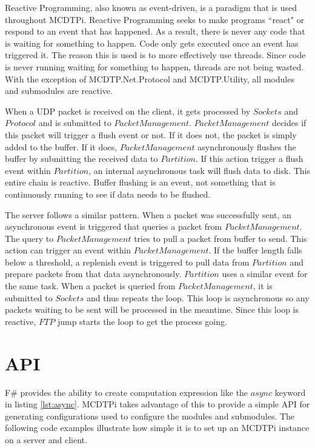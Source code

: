 Reactive Programming, also known as event-driven, is a paradigm that is used throughout MCDTPi. Reactive Programming seeks to make programs ``react" or respond to an event that has happened. As a result, there is never any code that is waiting for something to happen. Code only gets executed once an event has triggered it. The reason this is used is to more effectively use threads. Since code is never running waiting for something to happen, threads are not being wasted. With the exception of MCDTP.Net.Protocol and MCDTP.Utility, all modules and submodules are reactive.

When a UDP packet is received on the client, it gets processed by $Sockets$ and $Protocol$ and is submitted to $PacketManagement$. $PacketManagement$ decides if this packet will trigger a flush event or not. If it does not, the packet is simply added to the buffer. If it does, $PacketManagement$ asynchronously flushes the buffer by submitting the received data to $Partition$. If this action trigger a flush event within $Partition$, an internal asynchronous task will flush data to disk. This entire chain is reactive. Buffer flushing is an event, not something that is continuously running to see if data needs to be flushed.

The server follows a similar pattern. When a packet was successfully sent, an asynchronous event is triggered that queries a packet from $PacketManagement$. The query to $PacketManagement$ tries to pull a packet from buffer to send. This action can trigger an event within $PacketManagement$. If the buffer length falls below a threshold, a replenish event is triggered to pull data from $Partition$ and prepare packets from that data asynchronously. $Partition$ uses a similar event for the same task. When a packet is queried from $PacketManagement$, it is submitted to $Sockets$ and thus repeats the loop. This loop is asynchronous so any packets waiting to be sent will be processed in the meantime. Since this loop is reactive, $FTP$ jump starts the loop to get the process going.

\section{API}\label{sec:api}

F\# provides the ability to create computation expression like the $async$ keyword in listing \ref{lst:async}. MCDTPi takes advantage of this to provide a simple API for generating configurations used to configure the modules and submodules. The following code examples illustrate how simple it is to set up an MCDTPi instance on a server and client.

